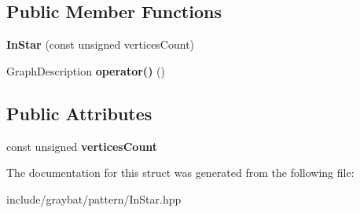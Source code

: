 \subsection*{Public Member Functions}
\begin{DoxyCompactItemize}
\item 
\hypertarget{structgraybat_1_1pattern_1_1InStar_afbaaffe9fe889764303590f251868e20}{}{\bfseries In\+Star} (const unsigned vertices\+Count)\label{structgraybat_1_1pattern_1_1InStar_afbaaffe9fe889764303590f251868e20}

\item 
\hypertarget{structgraybat_1_1pattern_1_1InStar_a4e92cd567d269d9e1f2fab25e2a83258}{}Graph\+Description {\bfseries operator()} ()\label{structgraybat_1_1pattern_1_1InStar_a4e92cd567d269d9e1f2fab25e2a83258}

\end{DoxyCompactItemize}
\subsection*{Public Attributes}
\begin{DoxyCompactItemize}
\item 
\hypertarget{structgraybat_1_1pattern_1_1InStar_abf069998e8c76bfe5365f01c3f1e686b}{}const unsigned {\bfseries vertices\+Count}\label{structgraybat_1_1pattern_1_1InStar_abf069998e8c76bfe5365f01c3f1e686b}

\end{DoxyCompactItemize}


The documentation for this struct was generated from the following file\+:\begin{DoxyCompactItemize}
\item 
include/graybat/pattern/In\+Star.\+hpp\end{DoxyCompactItemize}
